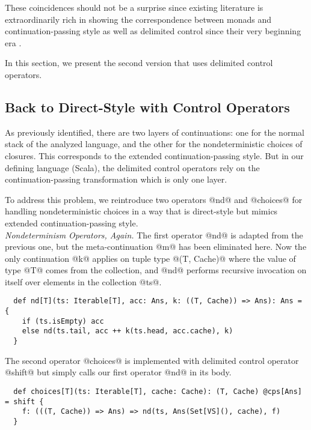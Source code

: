 \documentclass[acmsmall, review]{acmart}\settopmatter{}
\begin{document}
These coincidences should not be a surprise since existing literature is extraordinarily rich
in showing the correspondence between monads and continuation-passing style as well as
delimited control since their very beginning era \cite{Danvy:1990:AC:91556.91622, wadler1992essence,
danvy1992representing, moggi1991notions}.

In this section, we present the second version that uses delimited control operators.

\subsection{Back to Direct-Style with Control Operators} \label{uncps}

As previously identified, there are two layers of continuations: one for the normal stack 
of the analyzed language, and the other for the nondeterministic choices of closures.
This corresponds to the extended continuation-passing style.
But in our defining language (Scala), the delimited control operators rely on the continuation-passing 
transformation which is only one layer.

To address this problem, we reintroduce two operators @nd@ and @choices@ for handling 
nondeterministic choices in a way that is direct-style but mimics extended 
continuation-passing style. \\

\textit{Nondeterminism Operators, Again.}
The first operator @nd@ is adapted from the previous one, but the meta-continuation
@m@ has been eliminated here. Now the only continuation @k@ applies on tuple type @(T, Cache)@ 
where the value of type @T@ comes from the collection, and @nd@ performs recursive invocation
on itself over elements in the collection @ts@. 

\begin{lstlisting}
  def nd[T](ts: Iterable[T], acc: Ans, k: ((T, Cache)) => Ans): Ans = {
    if (ts.isEmpty) acc
    else nd(ts.tail, acc ++ k(ts.head, acc.cache), k)
  }
\end{lstlisting}

The second operator @choices@ is implemented with delimited control operator 
@shift@ but simply calls our first operator @nd@ in its body.

\begin{lstlisting}
  def choices[T](ts: Iterable[T], cache: Cache): (T, Cache) @cps[Ans] = shift {
    f: (((T, Cache)) => Ans) => nd(ts, Ans(Set[VS](), cache), f)
  }
\end{lstlisting}
\end{document}

